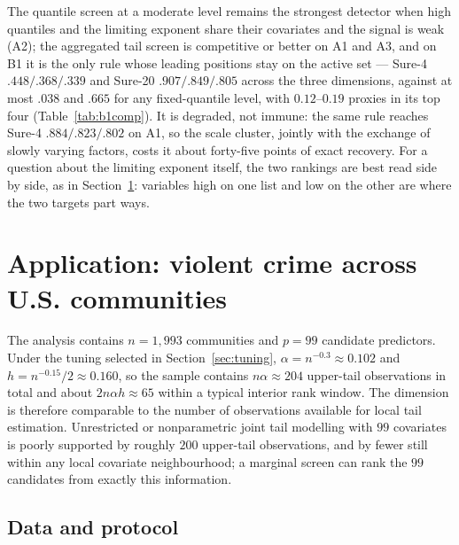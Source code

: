 \documentclass[bj,authoryear]{imsart}
\theoremstyle{plain}
\begin{document}
The quantile screen at a moderate level remains the strongest detector
when high quantiles and the limiting exponent share their covariates
and the signal is weak (A2); the aggregated tail screen is competitive
or better on A1 and A3, and on B1 it is the only rule whose leading
positions stay on the active set --- Sure-4 $.448/.368/.339$ and
Sure-20 $.907/.849/.805$ across the three dimensions, against at most
$.038$ and $.665$ for any fixed-quantile level, with $0.12$--$0.19$
proxies in its top four (Table~\ref{tab:b1comp}). It is degraded, not
immune: the same rule reaches Sure-4 $.884/.823/.802$ on A1, so the
scale cluster, jointly with the exchange of slowly varying factors,
costs it about forty-five points of exact recovery. For a question
about the limiting exponent itself, the two rankings are best read
side by side, as in Section~\ref{sec:realdata}: variables high on one
list and low on the other are where the two targets part ways.


\FloatBarrier

\section{Application: violent crime across U.S. communities}
\label{sec:realdata}

The analysis contains $n=1{,}993$ communities and $p=99$ candidate
predictors. Under the tuning selected in Section~\ref{sec:tuning},
$\alpha=n^{-0.3}\approx0.102$ and $h=n^{-0.15}/2\approx0.160$, so the
sample contains $n\alpha\approx204$ upper-tail observations in total and
about $2n\alpha h\approx65$ within a typical interior rank window. The
dimension is therefore comparable to the number of observations
available for local tail estimation. Unrestricted or nonparametric joint
tail modelling with $99$ covariates is poorly supported by roughly $200$
upper-tail observations, and by fewer still within any local covariate
neighbourhood; a marginal screen can rank the $99$ candidates from
exactly this information.

\subsection{Data and protocol}
\end{document}
